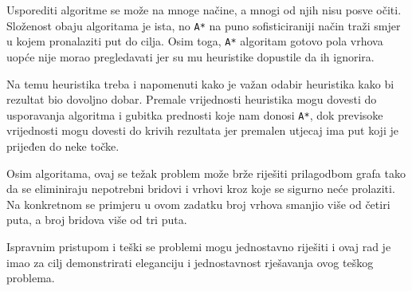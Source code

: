 \documentclass[11pt]{article}
\let\oldsection\section
\renewcommand\section{\clearpage\oldsection}
\begin{document}
Usporediti algoritme se može na mnoge načine, a mnogi od njih nisu posve očiti.
Složenost obaju algoritama je ista, no \texttt{A*} na puno sofisticiraniji
način traži smjer u kojem pronalaziti put do cilja. Osim toga, \texttt{A*}
algoritam gotovo pola vrhova uopće nije morao pregledavati jer su mu heuristike
dopustile da ih ignorira.

Na temu heuristika treba i napomenuti kako je važan odabir heuristika kako bi
rezultat bio dovoljno dobar. Premale vrijednosti heuristika mogu dovesti do
usporavanja algoritma i gubitka prednosti koje nam donosi \texttt{A*}, dok
previsoke vrijednosti mogu dovesti do krivih rezultata jer premalen utjecaj ima
put koji je prijeđen do neke točke.

Osim algoritama, ovaj se težak problem može brže riješiti prilagodbom grafa
tako da se eliminiraju nepotrebni bridovi i vrhovi kroz koje se sigurno neće
prolaziti. Na konkretnom se primjeru u ovom zadatku broj vrhova smanjio više od
četiri puta, a broj bridova više od tri puta.

Ispravnim pristupom i teški se problemi mogu jednostavno riješiti i ovaj rad je
imao za cilj demonstrirati eleganciju i jednostavnost rješavanja ovog teškog
problema.



\end{document}
